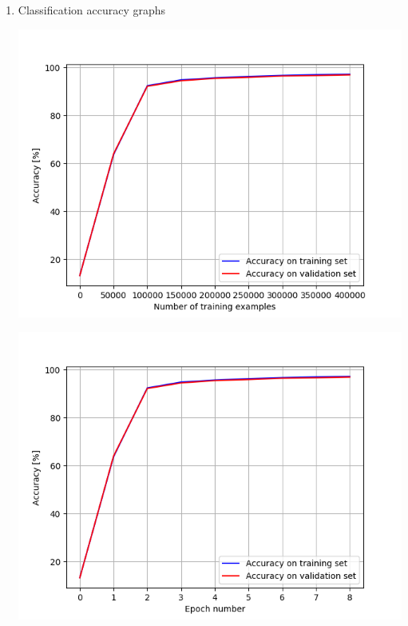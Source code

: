 \documentclass[a4paper]{iacas}
\begin{document}
\begin{enumerate}
\begin{enumerate}
\item Classification accuracy graphs

\vskip 0.1in
\begin{minipage}{\linewidth}
	\includegraphics[scale=0.8]{hw2_py/results/_14_01_43/lr_0_0001_net_1_CE_/accuracy.png}
	\label{fig_11}
\end{minipage}
\vskip 0.1in
\begin{minipage}{\linewidth}
	\includegraphics[scale=0.8]{hw2_py/results/_14_01_43/lr_0_0001_net_1_CE_/accuracy_epoch.png}
	\label{fig_12}
\end{minipage}
\vskip 0.1in


\end{enumerate}

\end{enumerate}
\end{document}
